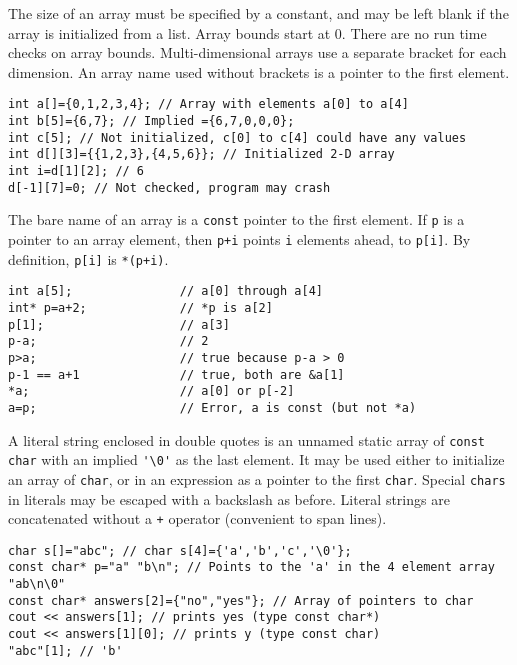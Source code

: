 			The size of an array must be specified by a constant, and may be left blank if the array is initialized from a list. Array bounds start at 0. There are no run time checks on array bounds. Multi-dimensional arrays use a separate bracket for each dimension. An array name used without brackets is a pointer to the first element.
			\begin{code}\begin{lstlisting}[style=list]
int a[]={0,1,2,3,4}; // Array with elements a[0] to a[4]
int b[5]={6,7}; // Implied ={6,7,0,0,0};
int c[5]; // Not initialized, c[0] to c[4] could have any values
int d[][3]={{1,2,3},{4,5,6}}; // Initialized 2-D array
int i=d[1][2]; // 6
d[-1][7]=0; // Not checked, program may crash
			\end{lstlisting}\end{code}
			
			\columnbreak
			The bare name of an array is a \lstinline!const! pointer to the first element. If \lstinline!p! is a pointer to an array element, then \lstinline!p+i! points \lstinline!i! elements ahead, to \lstinline!p[i]!. By definition, \lstinline!p[i]! is \lstinline!*(p+i)!.
			\begin{code}\begin{lstlisting}[style=list]
int a[5];               // a[0] through a[4]
int* p=a+2;             // *p is a[2]
p[1];                   // a[3]
p-a;                    // 2
p>a;                    // true because p-a > 0
p-1 == a+1              // true, both are &a[1]
*a;                     // a[0] or p[-2]
a=p;                    // Error, a is const (but not *a)
			\end{lstlisting}\end{code}
			
			A literal string enclosed in double quotes is an unnamed static array of \lstinline!const char! with an implied \lstinline!'\0'! as the last element. It may be used either to initialize an array of \lstinline!char!, or in an expression as a pointer to the first \lstinline!char!. Special \lstinline!chars! in literals may be escaped with a backslash as before. Literal strings are concatenated without a \lstinline!+! operator (convenient to span lines).
			\begin{code}\begin{lstlisting}[style=list]
char s[]="abc"; // char s[4]={'a','b','c','\0'};
const char* p="a" "b\n"; // Points to the 'a' in the 4 element array "ab\n\0"
const char* answers[2]={"no","yes"}; // Array of pointers to char
cout << answers[1]; // prints yes (type const char*)
cout << answers[1][0]; // prints y (type const char)
"abc"[1]; // 'b'
			\end{lstlisting}\end{code}
			

